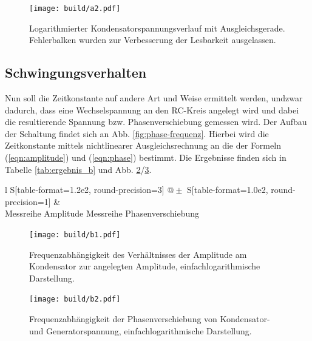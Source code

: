 \begin{figure}
  \centering
  \texttt{[image: build/a2.pdf]}
  \caption{Logarithmierter Kondensatorspannungsverlauf mit Ausgleichsgerade. Fehlerbalken wurden zur Verbesserung der Lesbarkeit ausgelassen.}
  \label{fig:auswertung_a}
\end{figure}

\subsection{Schwingungsverhalten}
\label{sec:b}
Nun soll die Zeitkonstante auf andere Art und Weise ermittelt werden, undzwar dadurch, dass eine Wechselspannung an den RC-Kreis angelegt wird und dabei die resultierende Spannung bzw. Phasenverschiebung gemessen wird. Der Aufbau der Schaltung findet sich an Abb. \ref{fig:phase-frequenz}. Hierbei wird die Zeitkonstante mittels nichtlinearer Ausgleichsrechnung an die der Formeln (\ref{eqn:amplitude}) und (\ref{eqn:phase}) bestimmt. Die Ergebnisse finden sich in Tabelle \ref{tab:ergebnis_b} und Abb. \ref{fig:auswertung_b1}/\ref{fig:auswertung_b2}.

\begin{table}
  \centering
  \caption{Ergebnis der Auswertung der Zeitkonstante des RC-Kreises.}
  \label{tab:ergebnis_b}
  \begin{tabular}{
    l
    S[table-format=1.2e2, round-precision=3] @{${}\pm{}$} S[table-format=1.0e2, round-precision=1]
  }
    \toprule
    &  \\
    \midrule
    Messreihe Amplitude 
    Messreihe Phasenverschiebung 
    \bottomrule
  \end{tabular}
\end{table}

\begin{figure}
  \centering
  \texttt{[image: build/b1.pdf]}
  \caption{Frequenzabhängigkeit des Verhältnisses der Amplitude am Kondensator zur angelegten Amplitude, einfachlogarithmische Darstellung.}
  \label{fig:auswertung_b1}
\end{figure}

\begin{figure}
  \centering
  \texttt{[image: build/b2.pdf]}
  \caption{Frequenzabhängigkeit der Phasenverschiebung von Kondensator- und Generatorspannung, einfachlogarithmische Darstellung.}
  \label{fig:auswertung_b2}
\end{figure}

